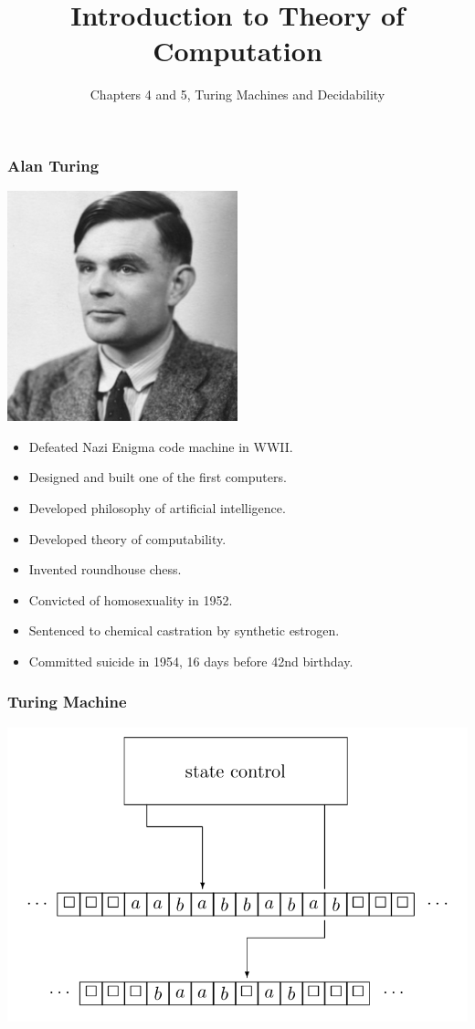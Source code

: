 \documentclass{beamer}
\title{Introduction to Theory of Computation}
\author{Chapters 4 and 5, Turing Machines and Decidability}
\newcommand{\bfr}[1]{\begin{frame}[fragile]\frametitle{{ #1 }}}
\begin{document}
\begin{frame}
\maketitle

\end{frame}

\bfr{Alan Turing}
\begin{multicols}{2}
\includegraphics[width=0.5\textwidth]{Turing}
\columnbreak
\begin{itemize}
  \pause
\item Defeated Nazi Enigma code machine in WWII.
  \pause
\item Designed and built one of the first computers.
  \pause
\item Developed philosophy of artificial intelligence.
  \pause
\item Developed theory of computability.
  \pause
\item Invented roundhouse chess.
  \pause
\end{itemize}
\end{multicols}

\begin{itemize}
\item Convicted of homosexuality in 1952.
  \pause
\item Sentenced to chemical castration by synthetic estrogen.
  \pause
\item Committed suicide in 1954, 16 days before 42nd birthday.
\end{itemize}

\end{frame}

\bfr{Turing Machine}
\includegraphics[width=\textwidth]{tm}
\end{frame}
\end{document}
